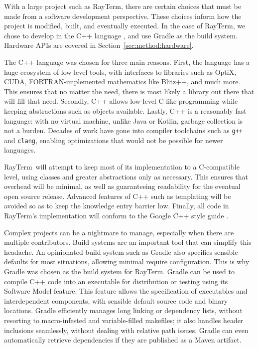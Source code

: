 \documentclass[11pt]{article}
\def\widow#1{\vskip #1\vbadness10000\penalty-200\vskip-#1}
\def\littlesection#1{
  \widow{2cm}
  \vskip 0.5cm
  \noindent{\bf #1}
  \vskip 0.0001cm
}
\newcommand{\name}{{\sc RayTerm}}
\begin{document}
With a large project such as \name, there are certain choices that must be made from a software development perspective.
These choices inform how the project is modified, built, and eventually executed.
In the case of \name, we chose to develop in the C++ language \cite{cpp14standard}, and use Gradle \cite{gradle} as the build system.
Hardware APIs are covered in Section~\ref{sec:method:hardware}.

\littlesection{Implementation Language}

The C++ language was chosen for three main reasons.
First, the language has a huge ecosystem of low-level tools, with interfaces to libraries such as OptiX, CUDA, FORTRAN-implemented mathematics like Blitz++, and much more.
This ensures that no matter the need, there is most likely a library out there that will fill that need.
Secondly, C++ allows low-level C-like programming while keeping abstractions such as objects available.
Lastly, C++ is a reasonably fast language: with no virtual machine, unlike Java or Kotlin, garbage collection is not a burden.
Decades of work have gone into compiler toolchains such as \texttt{g++} and \texttt{clang}, enabling optimizations that would not be possible for newer languages.

\name\ will attempt to keep most of its implementation to a C-compatible level, using classes and greater abstractions only as necessary.
This ensures that overhead will be minimal, as well as guaranteeing readability for the eventual open source release.
Advanced features of C++ such as templating will be avoided so as to keep the knowledge entry barrier low.
Finally, all code in \name's implementation will conform to the Google C++ style guide \cite{googleStyleGuide}.

\littlesection{Build System}

Complex projects can be a nightmare to manage, especially when there are multiple contributors.
Build systems are an important tool that can simplify this headache.
An opinionated build system such as Gradle also specifies sensible defaults for most situations, allowing minimal require configuration.
This is why Gradle was chosen as the build system for \name.
Gradle can be used to compile C++ code into an executable for distribution or testing using its Software Model feature.
This feature allows the specification of executables and interdependent components, with sensible default source code and binary locations.
Gradle efficiently manages long linking or dependency lists, without resorting to macro-infested and variable-filled makefiles; it also handles header inclusions seamlessly, without dealing with relative path issues.
Gradle can even automatically retrieve dependencies if they are published as a Maven artifact.
\end{document}
